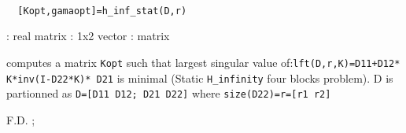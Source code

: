 \begin{mandesc}
   \\ %
\end{mandesc}
\begin{calling_sequence}
\begin{verbatim}
  [Kopt,gamaopt]=h_inf_stat(D,r)  
\end{verbatim}
\end{calling_sequence}
\begin{parameters}
  \begin{varlist}
    : real matrix
    : 1x2 vector
    : matrix
  \end{varlist}
\end{parameters}
\begin{mandescription}
  computes a matrix \verb!Kopt! such that largest singular value
  of:\verb!lft(D,r,K)=D11+D12* K*inv(I-D22*K)* D21!  is minimal (Static
  \verb!H_infinity! four blocks problem).  D is partionned as
  \verb!D=[D11 D12; D21 D22]!  where \verb!size(D22)=r=[r1 r2]!
\end{mandescription}
\begin{authors}
  F.D. ;   
\end{authors}
